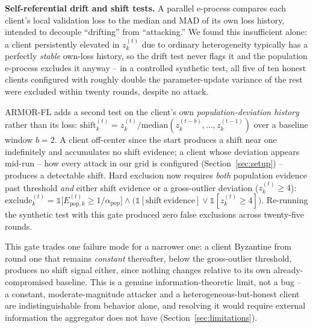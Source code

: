 \documentclass[pdflatex,iicol,sn-mathphys-num]{sn-jnl}%
\theoremstyle{thmstyleone}%
\theoremstyle{thmstyletwo}%
\theoremstyle{thmstylethree}%
\begin{document}
\textbf{Self-referential drift and shift tests.} A parallel e-process compares each client's local validation loss to the median and MAD of its own loss history, intended to decouple ``drifting'' from ``attacking.'' We found this insufficient alone: a client persistently elevated in $z_k^{(t)}$ due to ordinary heterogeneity typically has a perfectly \emph{stable} own-loss history, so the drift test never flags it and the population e-process excludes it anyway -- in a controlled synthetic test, all five of ten honest clients configured with roughly double the parameter-update variance of the rest were excluded within twenty rounds, despite no attack.

ARMOR-FL adds a second test on the client's own \emph{population-deviation history} rather than its loss: $\mathrm{shift}_k^{(t)} = z_k^{(t)} / \mathrm{median}(z_k^{(t-b)}, \dots, z_k^{(t-1)})$ over a baseline window $b=2$. A client off-center since the start produces a shift near one indefinitely and accumulates no shift evidence; a client whose deviation appears mid-run -- how every attack in our grid is configured (Section~\ref{sec:setup}) -- produces a detectable shift. Hard exclusion now requires \emph{both} population evidence past threshold \emph{and} either shift evidence or a gross-outlier deviation ($z_k^{(t)} \ge 4$): $\text{exclude}_k^{(t)} = \mathbb{1}\bigl[E_{\mathrm{pop},k}^{(t)} \ge 1/\alpha_{\mathrm{pop}}\bigr] \wedge \bigl(\mathbb{1}[\mathrm{shift\ evidence}] \vee \mathbb{1}[z_k^{(t)} \ge 4]\bigr)$. Re-running the synthetic test with this gate produced zero false exclusions across twenty-five rounds.

This gate trades one failure mode for a narrower one: a client Byzantine from round one that remains \emph{constant} thereafter, below the gross-outlier threshold, produces no shift signal either, since nothing changes relative to its own already-compromised baseline. This is a genuine information-theoretic limit, not a bug -- a constant, moderate-magnitude attacker and a heterogeneous-but-honest client are indistinguishable from behavior alone, and resolving it would require external information the aggregator does not have (Section~\ref{sec:limitations}).
\end{document}
